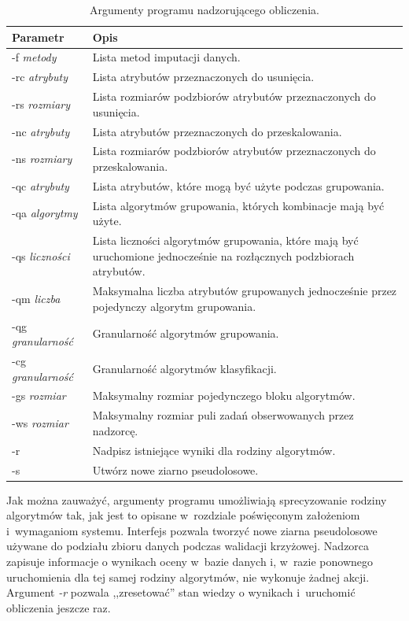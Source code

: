 \documentclass[../thesis.tex]{subfiles}
\begin{document}
\begin{table}[h]
\begin{center}
\begin{tabular}{ | l | p{110mm} | }
\hline
\rowcolor{lightgray} Parametr & Opis \\\hline

-f \emph{metody} & Lista metod imputacji danych.\\\hline
-rc \emph{atrybuty} & Lista atrybutów przeznaczonych do usunięcia.\\\hline
-rs \emph{rozmiary} & Lista rozmiarów podzbiorów atrybutów przeznaczonych do usunięcia.\\\hline
-nc \emph{atrybuty} & Lista atrybutów przeznaczonych do przeskalowania.\\\hline
-ns \emph{rozmiary} & Lista rozmiarów podzbiorów atrybutów przeznaczonych do przeskalowania.\\\hline
-qc \emph{atrybuty} & Lista atrybutów, które mogą być użyte podczas grupowania.\\\hline
-qa \emph{algorytmy} & Lista algorytmów grupowania, których kombinacje mają być użyte.\\\hline
-qs \emph{liczności} & Lista liczności algorytmów grupowania, które mają być uruchomione jednocześnie na rozłącznych podzbiorach atrybutów.\\\hline
-qm \emph{liczba} & Maksymalna liczba atrybutów grupowanych jednocześnie przez pojedynczy algorytm grupowania.\\\hline
-qg \emph{granularność} & Granularność algorytmów grupowania.\\\hline
-cg \emph{granularność} & Granularność algorytmów klasyfikacji.\\\hline
-gs \emph{rozmiar} & Maksymalny rozmiar pojedynczego bloku algorytmów.\\\hline
-ws \emph{rozmiar} & Maksymalny rozmiar puli zadań obserwowanych przez nadzorcę.\\\hline
-r & Nadpisz istniejące wyniki dla rodziny algorytmów.\\\hline
-s & Utwórz nowe ziarno pseudolosowe.\\\hline

\end{tabular}
\caption{Argumenty programu nadzorującego obliczenia.}
\label{proj:table_calculate_args}
\end{center}
\end{table}

Jak można zauważyć, argumenty programu umożliwiają sprecyzowanie rodziny algorytmów tak, jak jest to opisane w~rozdziale poświęconym założeniom i~wymaganiom systemu. Interfejs pozwala tworzyć nowe ziarna pseudolosowe używane do podziału zbioru danych podczas walidacji krzyżowej. Nadzorca zapisuje informacje o wynikach oceny w~bazie danych i, w~razie ponownego uruchomienia dla tej samej rodziny algorytmów, nie wykonuje żadnej akcji. Argument \emph{-r} pozwala ,,zresetować'' stan wiedzy o wynikach i~uruchomić obliczenia jeszcze raz.
\end{document}
